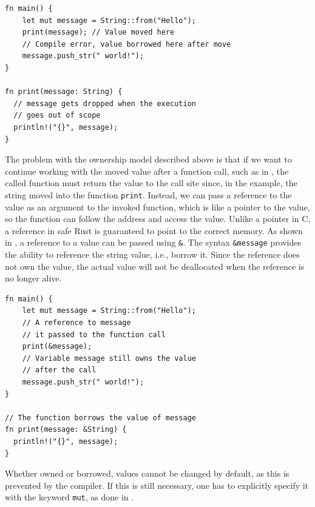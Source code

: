 \documentclass[paper=a4,%
  twoside,%
  BCOR4mm,%
  abstract=true,%
  toc=bibliography,%
  chapterprefix=true,%
  toc=bibliographynumbered,%
  open=right,%
  english,%
  pagesize=pdftex]{scrreprt}
\begin{document}
\begin{lstlisting}[style=boxed, caption={Transferring the ownership to a method}, label=lst:ownership-method-call]
fn main() {
    let mut message = String::from("Hello");
    print(message); // Value moved here
    // Compile error, value borrowed here after move
    message.push_str(" world!");
}

fn print(message: String) {
  // message gets dropped when the execution
  // goes out of scope
  println!("{}", message);
}
\end{lstlisting}

The problem with the ownership model described above is that if we want to continue working with the moved value after a function call, such as in , the called function must return the value to the call site since, in the example, the string moved into the function \texttt{print}. Instead, we can pass a reference to the value as an argument to the invoked function, which is like a pointer to the value, so the function can follow the address and access the value. Unlike a pointer in C, a reference in safe Rust is guaranteed to point to the correct memory. As shown in , a reference to a value can be passed using \texttt{\string&}. The syntax \texttt{\string&message} provides the ability to reference the string value, i.e., borrow it. Since the reference does not own the value, the actual value will not be deallocated when the reference is no longer alive.

\begin{lstlisting}[style=boxed, caption={Transferring the ownership to a method}, label=lst:borrowing-method-call]
fn main() {
    let mut message = String::from("Hello");
    // A reference to message
    // it passed to the function call
    print(&message);
    // Variable message still owns the value
    // after the call
    message.push_str(" world!");
}

// The function borrows the value of message
fn print(message: &String) {
  println!("{}", message);
}
\end{lstlisting}

Whether owned or borrowed, values cannot be changed by default, as this is prevented by the compiler. If this is still necessary, one has to explicitly specify it with the keyword \texttt{mut}, as done in .
\end{document}
